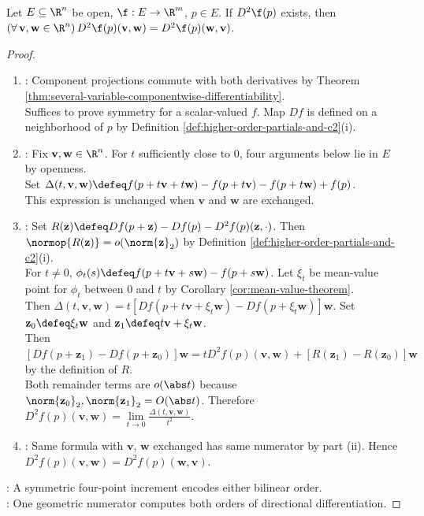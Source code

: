\begin{theorem} \label{thm:second-derivative-symmetric} \\
Let $E\subseteq\R^n$ be open, $\f:E\to\R^m$, $p\in E$. If $D^2\f(p)$ exists, then $(\forall\,\mathbf v,\mathbf w\in\R^n)\, D^2\f(p)(\mathbf v,\mathbf w)=D^2\f(p)(\mathbf w,\mathbf v)$.
\begin{proof}
\begin{enumerate}[label=(\roman*)]
\setlength{\itemsep}{0pt}
\item {}: Component projections commute with both derivatives by Theorem \ref{thm:several-variable-componentwise-differentiability}.\\
Suffices to prove symmetry for a scalar-valued $f$. Map $Df$ is defined on a neighborhood of $p$ by Definition \ref{def:higher-order-partials-and-c2}(i).
\item {}: Fix $\mathbf v,\mathbf w\in\R^n$. For $t$ sufficiently close to $0$, four arguments below lie in $E$ by openness.\\
Set $\Delta(t,\mathbf v,\mathbf w)\defeq f(p+t\mathbf v+t\mathbf w)-f(p+t\mathbf v)-f(p+t\mathbf w)+f(p)$.\\
This expression is unchanged when $\mathbf v$ and $\mathbf w$ are exchanged.
\item {}: Set $R(\mathbf z)\defeq Df(p+\mathbf z)-Df(p)-D^2f(p)(\mathbf z,\mathord\cdot)$. Then $\normop{R(\mathbf z)}=o(\norm{\mathbf z}_2)$ by Definition \ref{def:higher-order-partials-and-c2}(i).\\
For $t\neq0$, $\phi_t(s)\defeq f(p+t\mathbf v+s\mathbf w)-f(p+s\mathbf w)$. Let $\xi_t$ be mean-value point for $\phi_t$ between $0$ and $t$ by Corollary \ref{cor:mean-value-theorem}.\\
Then $\Delta(t,\mathbf v,\mathbf w)=t[Df(p+t\mathbf v+\xi_t\mathbf w)-Df(p+\xi_t\mathbf w)]\mathbf w$. Set $\mathbf z_0\defeq\xi_t\mathbf w$ and $\mathbf z_1\defeq t\mathbf v+\xi_t\mathbf w$.\\
Then $[Df(p+\mathbf z_1)-Df(p+\mathbf z_0)]\mathbf w=tD^2f(p)(\mathbf v,\mathbf w)+[R(\mathbf z_1)-R(\mathbf z_0)]\mathbf w$ by the definition of $R$.\\
Both remainder terms are $o(\abs t)$ because $\norm{\mathbf z_0}_2,\norm{\mathbf z_1}_2=O(\abs t)$. Therefore $D^2f(p)(\mathbf v,\mathbf w)=\lim\limits_{t\to0}\frac{\Delta(t,\mathbf v,\mathbf w)}{t^2}$.
\item {}: Same formula with $\mathbf v$, $\mathbf w$ exchanged has same numerator by part (ii). Hence $D^2f(p)(\mathbf v,\mathbf w)=D^2f(p)(\mathbf w,\mathbf v)$.
\end{enumerate}
: A symmetric four-point increment encodes either bilinear order.\\
: One geometric numerator computes both orders of directional differentiation.
\end{proof}
\end{theorem}

